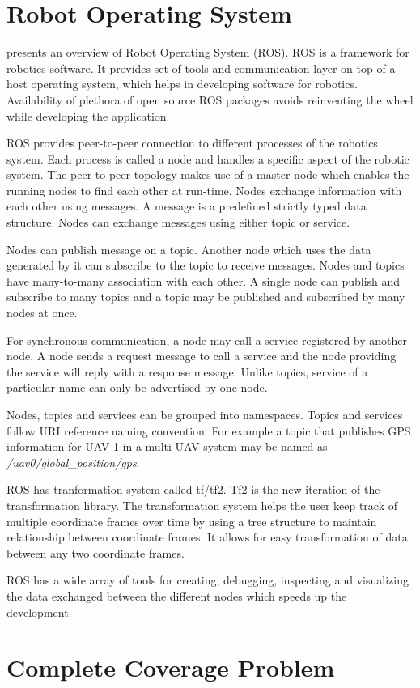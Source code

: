 \section{Robot Operating System}
 presents an overview of Robot Operating System (ROS). ROS is a framework for robotics software. It provides set of tools and communication layer on top of a host operating system, which helps in developing software for robotics. Availability of plethora of open source ROS packages avoids reinventing the wheel while developing the application.

ROS provides peer-to-peer connection to different processes of the robotics system. Each process is called a node and handles a specific aspect of the robotic system. The peer-to-peer topology makes use of a master node which enables the running nodes to find each other at run-time. Nodes exchange information with each other using messages. A message is a predefined strictly typed data structure. Nodes can exchange messages using either topic or service.

Nodes can publish message on a topic. Another node which uses the data generated by it can subscribe to the topic to receive messages. Nodes and topics have many-to-many association with each other. A single node can publish and subscribe to many topics and a topic may be published and subscribed by many nodes at once.

For synchronous communication, a node may call a service registered by another node. A node sends a request message to call a service and the node providing the service will reply with a response message. Unlike topics, service of a particular name can only be advertised by one node.

Nodes, topics and services can be grouped into namespaces. Topics and services follow URI reference naming convention. For example a topic that publishes GPS information for UAV 1 in a multi-UAV system may be named as \textit{/uav0/global\_position/gps}.

ROS has tranformation system called tf/tf2. Tf2 is the new iteration of the transformation library. The transformation system helps the user keep track of multiple coordinate frames over time by using a tree structure to maintain relationship between coordinate frames. It allows for easy transformation of data between any two coordinate frames.

ROS has a wide array of tools for creating, debugging, inspecting and visualizing the data exchanged between the different nodes which speeds up the development.


\section{Complete Coverage Problem}



\FloatBarrier

